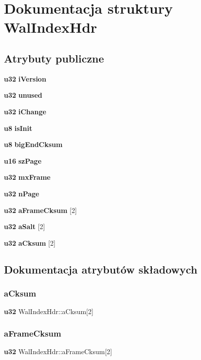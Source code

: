 \section{Dokumentacja struktury Wal\+Index\+Hdr}
\label{struct_wal_index_hdr}
\subsection*{Atrybuty publiczne}
\begin{DoxyCompactItemize}
\item 
\textbf{ u32} \textbf{ i\+Version}
\item 
\textbf{ u32} \textbf{ unused}
\item 
\textbf{ u32} \textbf{ i\+Change}
\item 
\textbf{ u8} \textbf{ is\+Init}
\item 
\textbf{ u8} \textbf{ big\+End\+Cksum}
\item 
\textbf{ u16} \textbf{ sz\+Page}
\item 
\textbf{ u32} \textbf{ mx\+Frame}
\item 
\textbf{ u32} \textbf{ n\+Page}
\item 
\textbf{ u32} \textbf{ a\+Frame\+Cksum} [2]
\item 
\textbf{ u32} \textbf{ a\+Salt} [2]
\item 
\textbf{ u32} \textbf{ a\+Cksum} [2]
\end{DoxyCompactItemize}


\subsection{Dokumentacja atrybutów składowych}
\mbox{\label{struct_wal_index_hdr_aa202339b02766d088717bfce9e3a9c0e}} 
\subsubsection{aCksum}
{\footnotesize\ttfamily \textbf{ u32} Wal\+Index\+Hdr\+::a\+Cksum[2]}

\mbox{\label{struct_wal_index_hdr_a425dff294e0f0b30b6819c273404c721}} 
\subsubsection{aFrameCksum}
{\footnotesize\ttfamily \textbf{ u32} Wal\+Index\+Hdr\+::a\+Frame\+Cksum[2]}

